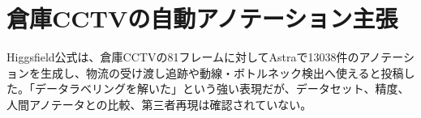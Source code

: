 \section{倉庫CCTVの自動アノテーション主張}
Higgsfield公式は、倉庫CCTVの81フレームに対してAstraで13038件のアノテーションを生成し、物流の受け渡し追跡や動線・ボトルネック検出へ使えると投稿した。「データラベリングを解いた」という強い表現だが、データセット、精度、人間アノテータとの比較、第三者再現は確認されていない。
